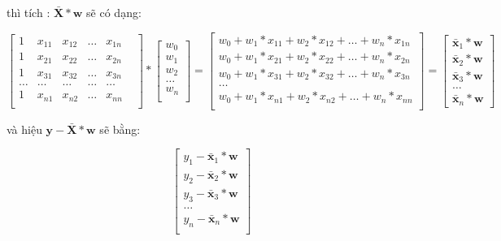 \documentclass[12pt,letterpaper]{article}
\begin{document}
    thì tích : $\bar{\textbf{X}}*\textbf{w}$ sẽ có dạng:
        
        $$
        \begin{bmatrix}
        1 & x_{1 1} & x_{1 2} & \dots & x_{1 n} \\
        1 & x_{2 1} & x_{2 2} & \dots & x_{2 n} \\
        1 & x_{3 1} & x_{3 2} & \dots & x_{3 n} \\
        \dots & \dots & \dots & \dots & \dots & \\
        1 & x_{n 1} & x_{n 2} & \dots & x_{n n} \\
        \end{bmatrix}
        *
        \begin{bmatrix}
        w_0 \\ w_1 \\ w_2 \\ \dots  \\ w_n \\
        \end{bmatrix}
        =
        \begin{bmatrix}
        w_0 + w_1 * x_{1 1} + w_2 * x_{1 2} + \dots + w_n * x_{1 n}\\
        w_0 + w_1 * x_{2 1} + w_2 * x_{2 2} + \dots + w_n * x_{2 n}\\
        w_0 + w_1 * x_{3 1} + w_2 * x_{3 2} + \dots + w_n * x_{3 n}\\
        \dots \\
        w_0 + w_1 * x_{n 1} + w_2 * x_{n 2} + \dots + w_n * x_{n n}\\
        \end{bmatrix}
        =
        \begin{bmatrix}
        \bar{\textbf{x}}_1*\textbf{w} \\
        \bar{\textbf{x}}_2*\textbf{w} \\ 
        \bar{\textbf{x}}_3*\textbf{w} \\
        \dots \\  
        \bar{\textbf{x}}_n*\textbf{w}
        \end{bmatrix}
        $$
        
    và hiệu $\textbf{y} - \bar{\textbf{X}}*\textbf{w}$ sẽ bằng:
        
        $$
        \begin{bmatrix}
        y_1 - \bar{\textbf{x}}_1*\textbf{w} \\ 
        y_2 - \bar{\textbf{x}}_2*\textbf{w} \\ 
        y_3 - \bar{\textbf{x}}_3*\textbf{w} \\ 
        \dots  \\ 
        y_n - \bar{\textbf{x}}_n*\textbf{w} \\
        \end{bmatrix}
        $$
        
\end{document}
